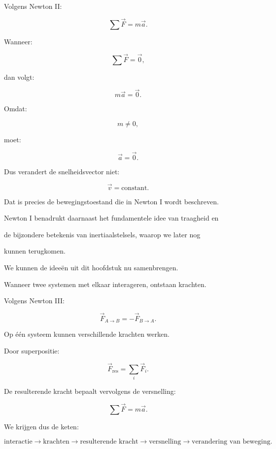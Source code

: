 \documentclass{ximera}
\begin{document}
Volgens Newton II:

\[\sum\vec F=m\vec a.\]

Wanneer:

\[\sum\vec F=\vec 0,\]

dan volgt:

\[m\vec a=\vec 0.\]

Omdat:

\[m\neq0,\]

moet:

\[\vec a=\vec 0.\]

Dus verandert de snelheidsvector niet:

\[\boxed{ \vec v=\text{constant}. }\]

Dat is precies de bewegingstoestand die in Newton I wordt beschreven.

Newton I benadrukt daarnaast het fundamentele idee van traagheid en

de bijzondere betekenis van inertiaalstelsels, waarop we later nog

kunnen terugkomen.






We kunnen de ideeën uit dit hoofdstuk nu samenbrengen.

Wanneer twee systemen met elkaar interageren, ontstaan krachten.

Volgens Newton III:

\[\boxed{ \vec F_{A\rightarrow B} = -\vec F_{B\rightarrow A}. }\]

Op één systeem kunnen verschillende krachten werken.

Door superpositie:

\[\boxed{ \vec F_{\mathrm{res}} = \sum_i\vec F_i. }\]

De resulterende kracht bepaalt vervolgens de versnelling:

\[\boxed{ \sum\vec F=m\vec a. }\]

We krijgen dus de keten:

\[\boxed{ \text{interactie} \longrightarrow \text{krachten} \longrightarrow \text{resulterende kracht} \longrightarrow \text{versnelling} \longrightarrow \text{verandering van beweging}. }\]


\end{document}
